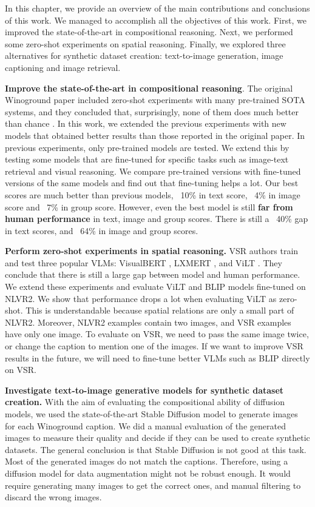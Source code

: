 In this chapter, we provide an overview of the main contributions and conclusions of this work. We managed to accomplish all the objectives of this work. First, we improved the state-of-the-art in compositional reasoning. Next, we performed some zero-shot experiments on spatial reasoning. Finally, we explored three alternatives for synthetic dataset creation: text-to-image generation, image captioning and image retrieval.

\textbf{Improve the state-of-the-art in compositional reasoning}. The original Winoground paper included zero-shot experiments with many pre-trained SOTA systems, and they concluded that, surprisingly, none of them does much better than chance \cite{thrush2022winoground}. In this work, we extended the previous experiments with new models that obtained better results than those reported in the original paper. In previous experiments, only pre-trained models are tested. We extend this by testing some models that are fine-tuned for specific tasks such as image-text retrieval and visual reasoning. We compare pre-trained versions with fine-tuned versions of the same models and find out that fine-tuning helps a lot. Our best scores are much better than previous models, ~10\% in text score, ~4\% in image score and ~7\% in group score. However, even the best model is still \textbf{far from human performance} in text, image and group scores. There is still a ~40\% gap in text scores, and ~64\% in image and group scores.

\textbf{Perform zero-shot experiments in spatial reasoning.} VSR authors \cite{liu2022visual} train and test three popular VLMs: VisualBERT \cite{li2019visualbert}, LXMERT \cite{tan2020lxmert}, and
ViLT \cite{kim2021vilt}. They conclude that there is still a large gap between model and human performance. We extend these experiments and evaluate ViLT \cite{kim2021vilt} and BLIP \cite{li2022blip} models fine-tuned on NLVR2. We show that performance drops a lot when evaluating ViLT as zero-shot. This is understandable because spatial relations are only a small part of NLVR2. Moreover, NLVR2 examples contain two images, and VSR examples have only one image. To evaluate on VSR, we need to pass the same image twice, or change the caption to mention one of the images. If we want to improve VSR results in the future, we will need to fine-tune better VLMs such as BLIP directly on VSR.

\textbf{Investigate text-to-image generative models for synthetic dataset creation.} With the aim of evaluating the compositional ability of diffusion models, we used the state-of-the-art Stable Diffusion model \cite{rombach2021highresolution} to generate images for each Winoground caption. We did a manual evaluation of the generated images to measure their quality and decide if they can be used to create synthetic datasets. The general conclusion is that Stable Diffusion is not good at this task. Most of the generated images do not match the captions. Therefore, using a diffusion model for data augmentation might not be robust enough. It would require generating many images to get the correct ones, and manual filtering to discard the wrong images.

